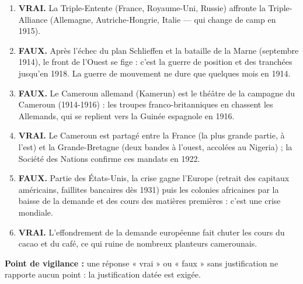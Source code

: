 \documentclass[11pt]{article}
\begin{document}
\begin{corrige}
\begin{enumerate}
\item \textbf{VRAI.} La Triple-Entente (France, Royaume-Uni, Russie) affronte la Triple-Alliance (Allemagne, Autriche-Hongrie, Italie — qui change de camp en 1915).
\item \textbf{FAUX.} Après l'échec du plan Schlieffen et la bataille de la Marne (septembre 1914), le front de l'Ouest se fige : c'est la guerre de position et des tranchées jusqu'en 1918. La guerre de mouvement ne dure que quelques mois en 1914.
\item \textbf{FAUX.} Le Cameroun allemand (Kamerun) est le théâtre de la campagne du Cameroun (1914-1916) : les troupes franco-britanniques en chassent les Allemands, qui se replient vers la Guinée espagnole en 1916.
\item \textbf{VRAI.} Le Cameroun est partagé entre la France (la plus grande partie, à l'est) et la Grande-Bretagne (deux bandes à l'ouest, accolées au Nigeria) ; la Société des Nations confirme ces mandats en 1922.
\item \textbf{FAUX.} Partie des États-Unis, la crise gagne l'Europe (retrait des capitaux américains, faillites bancaires dès 1931) puis les colonies africaines par la baisse de la demande et des cours des matières premières : c'est une crise mondiale.
\item \textbf{VRAI.} L'effondrement de la demande européenne fait chuter les cours du cacao et du café, ce qui ruine de nombreux planteurs camerounais.
\end{enumerate}
\textbf{Point de vigilance :} une réponse « vrai » ou « faux » sans justification ne rapporte aucun point : la justification datée est exigée.
\end{corrige}
\end{document}
